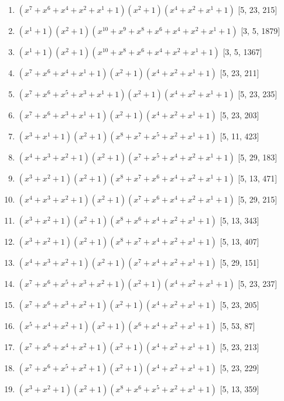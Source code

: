 \documentclass[10pt,twocolumn]{article}
\begin{document}
\begin{enumerate}
\item $(x^{7} + x^{6} + x^{4} + x^{2} + x^{1} + 1)(x^{2} + 1)(x^{4} + x^{2} + x^{1} + 1)$  [5, 23, 215]
\item $(x^{1} + 1)(x^{2} + 1)(x^{10} + x^{9} + x^{8} + x^{6} + x^{4} + x^{2} + x^{1} + 1)$  [3, 5, 1879]
\item $(x^{1} + 1)(x^{2} + 1)(x^{10} + x^{8} + x^{6} + x^{4} + x^{2} + x^{1} + 1)$  [3, 5, 1367]
\item $(x^{7} + x^{6} + x^{4} + x^{1} + 1)(x^{2} + 1)(x^{4} + x^{2} + x^{1} + 1)$  [5, 23, 211]
\item $(x^{7} + x^{6} + x^{5} + x^{3} + x^{1} + 1)(x^{2} + 1)(x^{4} + x^{2} + x^{1} + 1)$  [5, 23, 235]
\item $(x^{7} + x^{6} + x^{3} + x^{1} + 1)(x^{2} + 1)(x^{4} + x^{2} + x^{1} + 1)$  [5, 23, 203]
\item $(x^{3} + x^{1} + 1)(x^{2} + 1)(x^{8} + x^{7} + x^{5} + x^{2} + x^{1} + 1)$  [5, 11, 423]
\item $(x^{4} + x^{3} + x^{2} + 1)(x^{2} + 1)(x^{7} + x^{5} + x^{4} + x^{2} + x^{1} + 1)$  [5, 29, 183]
\item $(x^{3} + x^{2} + 1)(x^{2} + 1)(x^{8} + x^{7} + x^{6} + x^{4} + x^{2} + x^{1} + 1)$  [5, 13, 471]
\item $(x^{4} + x^{3} + x^{2} + 1)(x^{2} + 1)(x^{7} + x^{6} + x^{4} + x^{2} + x^{1} + 1)$  [5, 29, 215]
\item $(x^{3} + x^{2} + 1)(x^{2} + 1)(x^{8} + x^{6} + x^{4} + x^{2} + x^{1} + 1)$  [5, 13, 343]
\item $(x^{3} + x^{2} + 1)(x^{2} + 1)(x^{8} + x^{7} + x^{4} + x^{2} + x^{1} + 1)$  [5, 13, 407]
\item $(x^{4} + x^{3} + x^{2} + 1)(x^{2} + 1)(x^{7} + x^{4} + x^{2} + x^{1} + 1)$  [5, 29, 151]
\item $(x^{7} + x^{6} + x^{5} + x^{3} + x^{2} + 1)(x^{2} + 1)(x^{4} + x^{2} + x^{1} + 1)$  [5, 23, 237]
\item $(x^{7} + x^{6} + x^{3} + x^{2} + 1)(x^{2} + 1)(x^{4} + x^{2} + x^{1} + 1)$  [5, 23, 205]
\item $(x^{5} + x^{4} + x^{2} + 1)(x^{2} + 1)(x^{6} + x^{4} + x^{2} + x^{1} + 1)$  [5, 53, 87]
\item $(x^{7} + x^{6} + x^{4} + x^{2} + 1)(x^{2} + 1)(x^{4} + x^{2} + x^{1} + 1)$  [5, 23, 213]
\item $(x^{7} + x^{6} + x^{5} + x^{2} + 1)(x^{2} + 1)(x^{4} + x^{2} + x^{1} + 1)$  [5, 23, 229]
\item $(x^{3} + x^{2} + 1)(x^{2} + 1)(x^{8} + x^{6} + x^{5} + x^{2} + x^{1} + 1)$  [5, 13, 359]

\end{enumerate}
\end{document}
